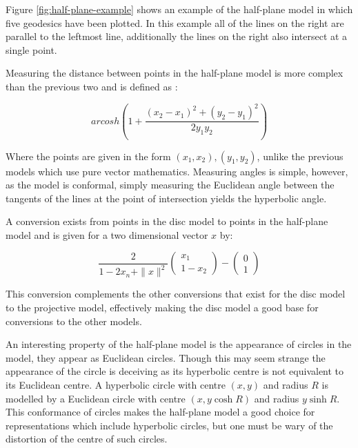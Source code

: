 Figure \ref{fig:half-plane-example} shows an example of the half-plane model in which five geodesics have been plotted. In this example all of the lines on the right are parallel to the leftmost line, additionally the lines on the right also intersect at a single point.

Measuring the distance between points in the half-plane model is more complex than the previous two and is defined as \cite{kubo_geometry_1988}:

\begin{equation}
\label{eq:half_plane_distance}
arcosh\left(1+\frac{(x_2-x_1)^2+(y_2-y_1)^2}{2y_1y_2}\right)
\end{equation}

Where the points are given in the form $(x_1, x_2), (y_1, y_2)$, unlike the previous models which use pure vector mathematics. Measuring angles is simple, however, as the model is conformal, simply measuring the Euclidean angle between the tangents of the lines at the point of intersection yields the hyperbolic angle.

A conversion exists from points in the disc model to points in the half-plane model and is given for a two dimensional vector $x$ by:

\begin{equation}
\label{eq:disc_to_plane}
\frac{2}{1-2x_n+\|x\|^2}
\begin{pmatrix}
x_1\\
1-x_2
\end{pmatrix}
- \begin{pmatrix}
0\\
1
\end{pmatrix}
\end{equation}

This conversion complements the other conversions that exist for the disc model to the projective model, effectively making the disc model a good base for conversions to the other models.

An interesting property of the half-plane model is the appearance of circles in the model, they appear as Euclidean circles. Though this may seem strange the appearance of the circle is deceiving as its hyperbolic centre is not equivalent to its Euclidean centre. A hyperbolic circle with centre $(x,y)$ and radius $R$ is modelled by a Euclidean circle with centre $(x, y \cosh R)$ and radius $y \sinh R$. This conformance of circles makes the half-plane model a good choice for representations which include hyperbolic circles, but one must be wary of the distortion of the centre of such circles.

